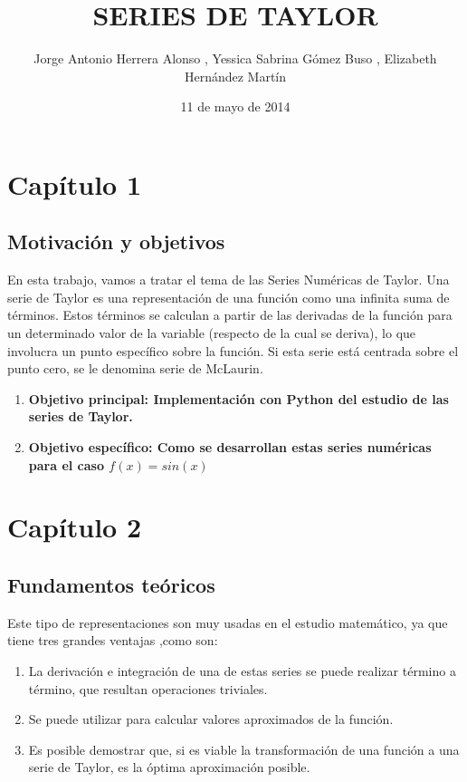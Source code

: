 \documentclass[spanish,a4paper,10pt]{article}
\begin{document}
\title{SERIES DE TAYLOR}
\author{Jorge Antonio Herrera Alonso , Yessica Sabrina Gómez Buso , Elizabeth Hernández Martín}
\date{11 de mayo de 2014}

\maketitle

\section{Capítulo 1}
\subsection{\bf Motivación y objetivos}
En esta trabajo, vamos a tratar el tema de las Series Numéricas de Taylor.
Una serie de Taylor es una representación de una función como una infinita suma de términos.
Estos términos se calculan a partir de las derivadas de la función para un determinado valor de la variable (respecto de la cual se deriva), lo que involucra un punto específico sobre la función. Si esta serie está centrada sobre el punto cero, se le denomina serie de McLaurin.

\begin{enumerate}
  \item
    \bf Objetivo principal: 
        Implementación con Python del estudio de las series de Taylor.
  \item
    \bf Objetivo específico: 
        Como se desarrollan estas series numéricas para el caso $f(x)=sin(x)$
\end{enumerate}

\section{Capítulo 2}
\subsection{\bf Fundamentos teóricos}
Este tipo de representaciones son muy usadas en el estudio matemático, ya que tiene tres grandes ventajas ,como son:
\begin{enumerate}
 \item
  La derivación e integración de una de estas series se puede realizar término a término, que resultan operaciones triviales.
 \item
  Se puede utilizar para calcular valores aproximados de la función.
 \item
  Es posible demostrar que, si es viable la transformación de una función a una serie de Taylor, es la óptima aproximación posible.
\end{enumerate}
\end{document}
